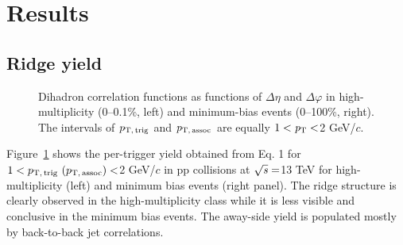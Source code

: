 
\section {Results}
\label{sec:results}

\subsection{Ridge yield}

\begin{figure}[h!]
	\centering
	\caption{ Dihadron correlation functions as functions of $\Delta\eta$ and $\Delta\varphi$ in high-multiplicity (0--0.1\%, left) and minimum-bias events (0--100\%, right). The intervals of $p_\mathrm{T,\,trig}$ and $p_\mathrm{T,\,assoc}$ are equally $1 < \it{p}_{\rm{T}} < $2 GeV/$c$. }
	\label{fig:PlotCorrMBHMT}
\end{figure}

Figure~\ref{fig:PlotCorrMBHMT} shows the per-trigger yield obtained from Eq. 1 for $1 < p_\mathrm{T,\,trig}~\mathrm (p_\mathrm{T,\,assoc}) < $2 GeV/$c$ in pp collisions at $\sqrt{\it{s}} = $\unit{13} {\rm{}TeV} for high-multiplicity (left) and minimum bias events (right panel). The ridge structure is clearly observed in the high-multiplicity class while it is less visible and conclusive in the minimum bias events. The away-side yield is populated mostly by back-to-back jet correlations.

